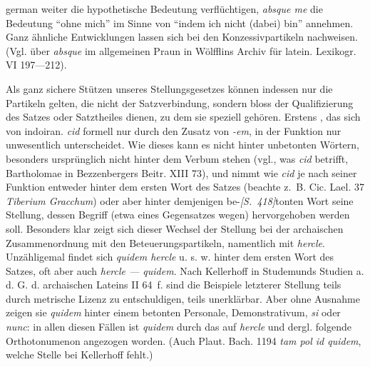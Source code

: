 \begin{otherlanguage*}{german}
weiter die hypothetische Bedeutung verflüchtigen, \emph{absque me} die Bedeutung “ohne mich” im Sinne von “indem ich nicht (dabei) bin” annehmen. Ganz ähnliche Entwicklungen lassen sich bei den Konzessivpartikeln nachweisen. (Vgl. über \emph{absque} im allgemeinen Praun in Wölfflins Archiv für latein. Lexikogr. VI 197—212).

Als ganz sichere Stützen unseres Stellungsgesetzes können indessen nur die Partikeln gelten, die nicht der Satzverbindung, sondern bloss der Qualifizierung des Satzes oder Satztheiles dienen, zu dem sie speziell gehören. Erstens \emph{}, das sich von indoiran. \emph{cid} formell nur durch den Zusatz von \emph{-em}, in der Funktion nur unwesentlich unterscheidet. Wie dieses kann es nicht hinter unbetonten Wörtern, besonders ursprünglich nicht hinter dem Verbum stehen (vgl., was \emph{cid} betrifft, Bartholomae in Bezzenbergers Beitr. XIII 73), und nimmt wie \emph{cid} je nach seiner Funktion entweder hinter dem ersten Wort des Satzes (beachte z.~B. Cic. Lael. 37 \emph{Tiberium  Gracchum}) oder aber hinter demjenigen be-\hypertarget{p418}{\emph{[S.~418]}}\label{p418}tonten Wort seine Stellung, dessen Begriff (etwa eines Gegensatzes wegen) hervorgehoben werden soll. Besonders klar zeigt sich dieser Wechsel der Stellung bei der archaischen Zusammenordnung mit den Beteuerungspartikeln, namentlich mit \emph{hercle}. Unzähligemal findet sich \emph{quidem hercle} u. s. w. hinter dem ersten Wort des Satzes, oft aber auch \emph{hercle — quidem}. Nach Kellerhoff in Studemunds Studien a. d. G. d. archaischen Lateins II 64~f. sind die Beispiele letzterer Stellung teils durch metrische Lizenz zu entschuldigen, teils unerklärbar. Aber ohne Ausnahme zeigen sie \emph{quidem} hinter einem betonten Personale, Demonstrativum, \emph{si} oder \emph{nunc}: in allen diesen Fällen ist \emph{quidem} durch das auf \emph{hercle} und dergl. folgende Orthotonumenon angezogen worden. (Auch Plaut. Bach. 1194 \emph{tam pol id quidem}, welche Stelle bei Kellerhoff fehlt.)


\end{otherlanguage*}

